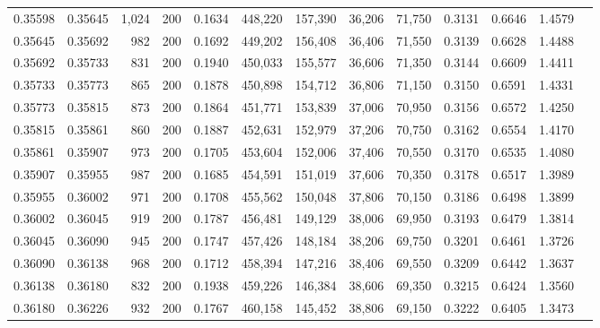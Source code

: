 \begin{tabular}{rrrrrrrrrrrrr}
0.35598 & 0.35645 &  1,024 & 200 &                                     0.1634 & 448,220 & 157,390 &  36,206 &  71,750 & 0.3131 & 0.6646 & 1.4579 \\
0.35645 & 0.35692 &    982 & 200 &                                     0.1692 & 449,202 & 156,408 &  36,406 &  71,550 & 0.3139 & 0.6628 & 1.4488 \\
0.35692 & 0.35733 &    831 & 200 &                                     0.1940 & 450,033 & 155,577 &  36,606 &  71,350 & 0.3144 & 0.6609 & 1.4411 \\
0.35733 & 0.35773 &    865 & 200 &                                     0.1878 & 450,898 & 154,712 &  36,806 &  71,150 & 0.3150 & 0.6591 & 1.4331 \\
0.35773 & 0.35815 &    873 & 200 &                                     0.1864 & 451,771 & 153,839 &  37,006 &  70,950 & 0.3156 & 0.6572 & 1.4250 \\
0.35815 & 0.35861 &    860 & 200 &                                     0.1887 & 452,631 & 152,979 &  37,206 &  70,750 & 0.3162 & 0.6554 & 1.4170 \\
0.35861 & 0.35907 &    973 & 200 &                                     0.1705 & 453,604 & 152,006 &  37,406 &  70,550 & 0.3170 & 0.6535 & 1.4080 \\
0.35907 & 0.35955 &    987 & 200 &                                     0.1685 & 454,591 & 151,019 &  37,606 &  70,350 & 0.3178 & 0.6517 & 1.3989 \\
0.35955 & 0.36002 &    971 & 200 &                                     0.1708 & 455,562 & 150,048 &  37,806 &  70,150 & 0.3186 & 0.6498 & 1.3899 \\
0.36002 & 0.36045 &    919 & 200 &                                     0.1787 & 456,481 & 149,129 &  38,006 &  69,950 & 0.3193 & 0.6479 & 1.3814 \\
0.36045 & 0.36090 &    945 & 200 &                                     0.1747 & 457,426 & 148,184 &  38,206 &  69,750 & 0.3201 & 0.6461 & 1.3726 \\
0.36090 & 0.36138 &    968 & 200 &                                     0.1712 & 458,394 & 147,216 &  38,406 &  69,550 & 0.3209 & 0.6442 & 1.3637 \\
0.36138 & 0.36180 &    832 & 200 &                                     0.1938 & 459,226 & 146,384 &  38,606 &  69,350 & 0.3215 & 0.6424 & 1.3560 \\
0.36180 & 0.36226 &    932 & 200 &                                     0.1767 & 460,158 & 145,452 &  38,806 &  69,150 & 0.3222 & 0.6405 & 1.3473 \\

\end{tabular}

